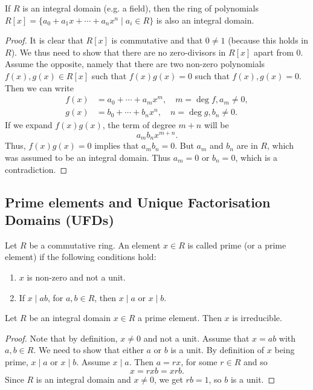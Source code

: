\documentclass[10pt, a4paper]{article}
\begin{document}
\begin{proposition}
    If $R$ is an integral domain
    (e.g. a field),
    then the ring of polynomials $R[x] = \{a_0 + a_1x + \dotsi + a_nx ^ n \mid a_i \in R\}$ is also an integral domain.

    \begin{proof}
        It is clear that $R[x]$ is commutative and that $0 \neq 1$
        (because this holds in $R$).
        We thus need to show that there are no zero-divisors in $R[x]$ apart from $0$.
        Assume the opposite,
        namely that there are two non-zero polynomials $f(x), g(x) \in R[x]$ such that $f(x)g(x) = 0$ such that $f(x),g(x) = 0$.
        Then we can write
        \begin{align*}
            f(x) &= a_0 + \dotsi + a_mx ^ m,\quad m = \deg{f}, a_m \neq 0, \\
            g(x) &= b_0 + \dotsi + b_nx ^ n,\quad n = \deg{g}, b_n \neq 0.
        \end{align*}
        If we expand $f(x)g(x)$,
        the term of degree $m + n$ will be
        \[
        a_mb_nx ^ {m + n}.
        \]
        Thus,
        $f(x)g(x) = 0$ implies that $a_mb_n = 0$.
        But $a_m$ and $b_n$ are in $R$,
        which was assumed to be an integral domain.
        Thus $a_m = 0$ or $b_n = 0$,
        which is a contradiction.
    \end{proof}
\end{proposition}

\subsection{Prime elements and Unique Factorisation Domains
    (UFDs)}
\begin{definition}
    Let $R$ be a commutative ring.
    An element $x \in R$ is called prime
    (or a prime element)
    if the following conditions hold:
    \begin{enumerate}[label = \roman*)]
        \item $x$ is non-zero and not a unit.

        \item If $x \mid ab$,
        for $a, b \in R$,
        then $x \mid a$ or $x \mid b$.
    \end{enumerate}
\end{definition}

\begin{lemma}
    Let $R$ be an integral domain $x \in R$ a prime element.
    Then $x$ is irreducible.

    \begin{proof}
        Note that by definition,
        $x \neq 0$ and not a unit.
        Assume that $x = ab$ with $a, b \in R$.
        We need to show that either $a$ or $b$ is a unit.
        By definition of $x$ being prime,
        $x \mid a$ or $x \mid b$.
        Assume $x \mid a$.
        Then $a = rx$,
        for some $r \in R$ and so
        \[
        x = rxb = xrb.
        \]
        Since $R$ is an integral domain and $x \neq 0$,
        we get $rb = 1$,
        so $b$ is a unit.
    \end{proof}
\end{lemma}
\end{document}
